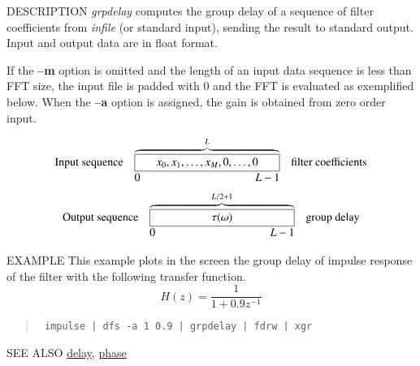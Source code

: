 \begin{qsection}{DESCRIPTION}
{\em grpdelay} computes the group delay of a sequence of filter coefficients 
from {\em infile} (or standard input), 
sending the result to standard output.
Input and output data are in float format.
\par
If the {\bf --m} option is omitted
and the length of an input data sequence is less than FFT size,
the input file is padded with 0 and the FFT is evaluated
as exemplified below.
When the {\bf --a} option is assigned,
the gain is obtained from zero order input.
\par
\[
\begin{array}{lll}
\mbox{Input sequence} & 
\overbrace{\framebox[4.5cm]{$x_0, x_1, \ldots, x_{M}, 0,
					\ldots,0$}}^{L}  & \mbox{filter coefficients}\\
		& \makebox[4.5cm]{0\hfill $L-1$} &
\end{array}
\]
\[
\begin{array}{lll}
\mbox{Output sequence} & \overbrace{\framebox[4.5cm]{$\tau(\omega)$}}^{L/2+1} &
	   \mbox{group delay}\\
		& \makebox[4.5cm]{0\hfill $L-1$} &

\end{array}
\]
\end{qsection}

\begin{options}
\end{options}


\begin{qsection}{EXAMPLE}
This example plots in the screen the group delay of impulse response
of the filter with the following transfer function.
\begin{displaymath}
  H(z)=\frac{1}{1+0.9z^{-1}}
\end{displaymath}
\begin{quote}
\verb! impulse | dfs -a 1 0.9 | grpdelay | fdrw | xgr !
\end{quote}  
\end{qsection}

\begin{qsection}{SEE ALSO}
\hyperlink{delay}{delay},
\hyperlink{phase}{phase}
\end{qsection}
